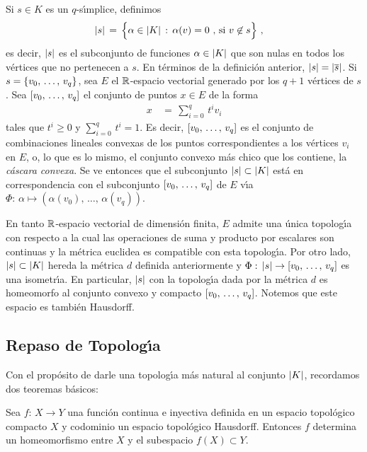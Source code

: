 Si $s\in K$ es un $q$-s\'{\i}mplice, definimos
\begin{align*}
	\left|s\right| & \,=\,\Big\{\alpha\in\left|K\right|\,:\,
		\alpha(v)=0\text{ , si }v\not\in s\Big\}
	\text{ ,}
\end{align*}
%
es decir, $\left|s\right|$ es el subconjunto de funciones $\alpha\in\left|K\right|$
que son nulas en todos los v\'{e}rtices que no pertenecen a $s$. En
t\'{e}rminos de la definici\'{o}n anterior, $\left|s\right|=\left|\overline{s}\right|$. Si
$s=\{\lista[0]{v}{q}\}$, sea $E$ el $\mathbb{R}$-espacio vectorial generado
por los $q+1$ v\'{e}rtices de $s$. Sea $\simp{\lista[0]{v}{q}}$ el conjunto
de puntos $x\in E$ de la forma
\begin{align*}
	x & \,=\,\sum_{i=0}^{q}\,t^{i}v_{i}
\end{align*}
%
tales que $t^{i}\geq 0$ y $\sum_{i=0}^{q}\,t^{i}=1$. Es decir,
$\simp{\lista[0]{v}{q}}$ es el conjunto de combinaciones lineales
convexas de los puntos correspondientes a los v\'{e}rtices $v_{i}$ en $E$,
o, lo que es lo mismo, el conjunto convexo m\'{a}s chico que los contiene,
la \emph{c\'{a}scara convexa}. Se ve entonces que el subconjunto
$\left|s\right|\subset\left|K\right|$ est\'{a} en correspondencia con el subconjunto
$\simp{\lista[0]{v}{q}}$ de $E$ v\'{\i}a
$\Phi:\,\alpha\mapsto (\alpha(v_{0}),\,\dots,\,\alpha(v_{q}))$.

En tanto $\mathbb{R}$-espacio vectorial de dimensi\'{o}n finita, $E$ admite una
\'{u}nica topolog\'{\i}a con respecto a la cual las operaciones de suma y
producto por escalares son continuas y la m\'{e}trica euclidea es compatible
con esta topolog\'{\i}a. Por otro lado, $\left|s\right|\subset\left|K\right|$ hereda la
m\'{e}trica $d$ definida anteriormente y
$\Phi:\,\geom{s}\rightarrow\simp{\lista[0]{v}{q}}$ es una isometr\'{\i}a.
En particular, $\left|s\right|$ con la topolog\'{\i}a dada por la m\'{e}trica $d$
es homeomorfo al conjunto convexo y compacto $\simp{\lista[0]{v}{q}}$.
Notemos que este espacio es tambi\'{e}n Hausdorff.

\subsection{Repaso de Topolog\'{\i}a}
Con el prop\'{o}sito de darle una topolog\'{\i}a m\'{a}s natural al
conjunto $\left|K\right|$, recordamos dos teoremas b\'{a}sicos:

\begin{teoCompactoHausdorff}[de rigidez]\label{thm:compactohausdorff}
	Sea $f:\,X\rightarrow Y$ una funci\'{o}n continua e inyectiva
	definida en un espacio topol\'{o}gico compacto $X$ y codominio
	un espacio topol\'{o}gico Hausdorff. Entonces $f$ determina un
	homeomorfismo entre $X$ y el subespacio $f(X)\subset Y$.
\end{teoCompactoHausdorff}

